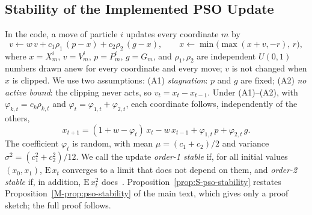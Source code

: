 \subsection{Stability of the Implemented PSO Update}
\label{sec:S-th-pso}
In the code, a move of particle $i$ updates every coordinate $m$ by
\begin{equation}
v\leftarrow w\,v+c_1\rho_1\,(p-x)+c_2\rho_2\,(g-x),\qquad x\leftarrow \min\bigl(\max(x+v,-r),\,r\bigr),
\label{eq:S-th-upd}
\end{equation}
where $x=X^i_m$, $v=V^i_m$, $p=P^i_m$, $g=G_m$, and $\rho_1,\rho_2$ are independent $U(0,1)$ numbers drawn anew for every coordinate and every move; $v$ is not changed when $x$ is clipped. We use two assumptions: (A1) \emph{stagnation}: $p$ and $g$ are fixed; (A2) \emph{no active bound}: the clipping never acts, so $v_t=x_t-x_{t-1}$. Under (A1)--(A2), with $\varphi_{k,t}=c_k\rho_{k,t}$ and $\varphi_t=\varphi_{1,t}+\varphi_{2,t}$, each coordinate follows, independently of the others,
\begin{equation}
x_{t+1}=(1+w-\varphi_t)\,x_t-w\,x_{t-1}+\varphi_{1,t}\,p+\varphi_{2,t}\,g .
\label{eq:S-th-rec}
\end{equation}
The coefficient $\varphi_t$ is random, with mean $\mu=(c_1+c_2)/2$ and variance $\sigma^2=(c_1^2+c_2^2)/12$. We call the update \emph{order-1 stable} if, for all initial values $(x_0,x_1)$, $\mathrm E\,x_t$ converges to a limit that does not depend on them, and \emph{order-2 stable} if, in addition, $\mathrm E\,x_t^2$ does~\cite{Poli2009}. Proposition~\ref{prop:S-pso-stability} restates Proposition~\ref{M-prop:pso-stability} of the main text, which gives only a proof sketch; the full proof follows.

